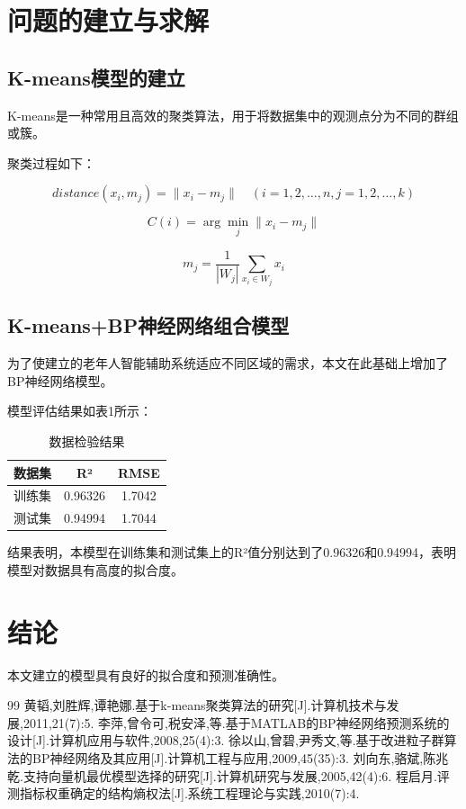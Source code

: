 \documentclass[a4paper]{article}
\begin{document}
\section{问题的建立与求解}

\subsection{K-means模型的建立}

K-means是一种常用且高效的聚类算法，用于将数据集中的观测点分为不同的群组或簇。

聚类过程如下：

\[
distance(x_i,m_j) = \|x_i - m_j\| \quad (i=1,2,\ldots,n,j=1,2,\ldots,k) \tag{1}
\]

\[
C(i) = \arg\min_j \|x_i - m_j\| \tag{2}
\]

\[
m_j = \frac{1}{|W_j|}\sum_{x_i\in W_j}x_i \tag{3}
\]

\subsection{K-means+BP神经网络组合模型}

为了使建立的老年人智能辅助系统适应不同区域的需求，本文在此基础上增加了BP神经网络模型。

模型评估结果如表1所示：

\begin{table}[H]
    \centering
    \caption{数据检验结果}
    \begin{tabular}{ccc}
        \toprule
        \textbf{数据集} & \textbf{R²} & \textbf{RMSE} \\
        \midrule
        训练集 & 0.96326 & 1.7042 \\
        测试集 & 0.94994 & 1.7044 \\
        \bottomrule
    \end{tabular}
\end{table}

结果表明，本模型在训练集和测试集上的R²值分别达到了0.96326和0.94994，表明模型对数据具有高度的拟合度。

\section{结论}

本文建立的模型具有良好的拟合度和预测准确性。

\begin{thebibliography}{99}
     黄韬,刘胜辉,谭艳娜.基于k-means聚类算法的研究[J].计算机技术与发展,2011,21(7):5.
     李萍,曾令可,税安泽,等.基于MATLAB的BP神经网络预测系统的设计[J].计算机应用与软件,2008,25(4):3.
     徐以山,曾碧,尹秀文,等.基于改进粒子群算法的BP神经网络及其应用[J].计算机工程与应用,2009,45(35):3.
     刘向东,骆斌,陈兆乾.支持向量机最优模型选择的研究[J].计算机研究与发展,2005,42(4):6.
     程启月.评测指标权重确定的结构熵权法[J].系统工程理论与实践,2010(7):4.
\end{thebibliography}
\end{document}
